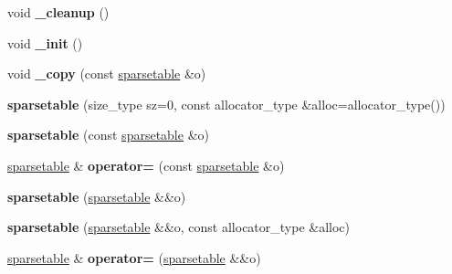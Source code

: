 \begin{DoxyCompactItemize}
\item 
void {\bfseries \+\_\+cleanup} ()\hypertarget{classspp___1_1sparsetable_ae8be9b227d7d0e0b36a32938549e7681}{}\label{classspp___1_1sparsetable_ae8be9b227d7d0e0b36a32938549e7681}

\item 
void {\bfseries \+\_\+init} ()\hypertarget{classspp___1_1sparsetable_a79e6c79ec9a2023fadc1ccad603a127a}{}\label{classspp___1_1sparsetable_a79e6c79ec9a2023fadc1ccad603a127a}

\item 
void {\bfseries \+\_\+copy} (const \hyperlink{classspp___1_1sparsetable}{sparsetable} \&o)\hypertarget{classspp___1_1sparsetable_a22e174d1573824f28c120ab793c1167e}{}\label{classspp___1_1sparsetable_a22e174d1573824f28c120ab793c1167e}

\item 
{\bfseries sparsetable} (size\+\_\+type sz=0, const allocator\+\_\+type \&alloc=allocator\+\_\+type())\hypertarget{classspp___1_1sparsetable_a3b8e5f6d1490cff031f5c7565e7c6082}{}\label{classspp___1_1sparsetable_a3b8e5f6d1490cff031f5c7565e7c6082}

\item 
{\bfseries sparsetable} (const \hyperlink{classspp___1_1sparsetable}{sparsetable} \&o)\hypertarget{classspp___1_1sparsetable_abfb3cc81a2e84d7c297af5b747d9c761}{}\label{classspp___1_1sparsetable_abfb3cc81a2e84d7c297af5b747d9c761}

\item 
\hyperlink{classspp___1_1sparsetable}{sparsetable} \& {\bfseries operator=} (const \hyperlink{classspp___1_1sparsetable}{sparsetable} \&o)\hypertarget{classspp___1_1sparsetable_a41e80c9cb7ab78ea3d07a3b7794957eb}{}\label{classspp___1_1sparsetable_a41e80c9cb7ab78ea3d07a3b7794957eb}

\item 
{\bfseries sparsetable} (\hyperlink{classspp___1_1sparsetable}{sparsetable} \&\&o)\hypertarget{classspp___1_1sparsetable_a4cc853d30faf6c82241e8af4beffdce6}{}\label{classspp___1_1sparsetable_a4cc853d30faf6c82241e8af4beffdce6}

\item 
{\bfseries sparsetable} (\hyperlink{classspp___1_1sparsetable}{sparsetable} \&\&o, const allocator\+\_\+type \&alloc)\hypertarget{classspp___1_1sparsetable_a0a01ede61d93654459a3caec2d4de5f9}{}\label{classspp___1_1sparsetable_a0a01ede61d93654459a3caec2d4de5f9}

\item 
\hyperlink{classspp___1_1sparsetable}{sparsetable} \& {\bfseries operator=} (\hyperlink{classspp___1_1sparsetable}{sparsetable} \&\&o)\hypertarget{classspp___1_1sparsetable_ada53f025ad5a389b88a23f55a862db53}{}\label{classspp___1_1sparsetable_ada53f025ad5a389b88a23f55a862db53}


\end{DoxyCompactItemize}
